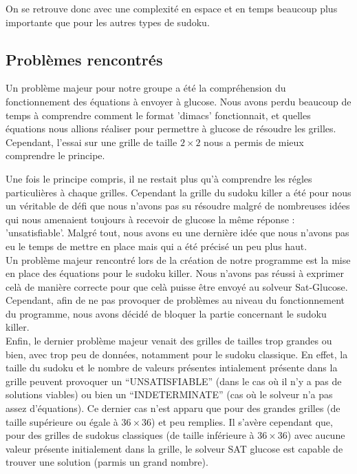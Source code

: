 \documentclass[a4paper,8pt,french,fleqn]{article}
\begin{document}
On se retrouve donc avec une complexité en espace et en temps beaucoup plus importante que pour les autres types de sudoku.

\subsection{Problèmes rencontrés}

Un problème majeur pour notre groupe a été la compréhension du fonctionnement des équations à envoyer à glucose. Nous avons perdu beaucoup de temps à comprendre comment le format 'dimacs' fonctionnait, et quelles équations nous allions réaliser pour permettre à glucose de résoudre les grilles. Cependant, l'essai sur une grille de taille $2 \times 2$ nous a permis de mieux comprendre le principe.

Une fois le principe compris, il ne restait plus qu'à comprendre les régles particulières à chaque grilles. Cependant la grille du sudoku killer a été pour nous un véritable de défi que nous n'avons pas su résoudre malgré de nombreuses idées qui nous amenaient toujours à recevoir de glucose la même réponse : 'unsatisfiable'. Malgré tout, nous avons eu une dernière idée que nous n'avons pas eu le temps de mettre en place mais qui a été précisé un peu plus haut. \\

Un problème majeur rencontré lors de la création de notre programme est la mise en place des équations pour le sudoku killer. Nous n'avons pas réussi à exprimer celà de manière correcte pour que celà puisse être envoyé au solveur Sat-Glucose. Cependant, afin de ne pas provoquer de problèmes au niveau du fonctionnement du programme, nous avons décidé de bloquer la partie concernant le sudoku killer.\\ 

Enfin, le dernier problème majeur venait des grilles de tailles trop grandes ou bien, avec trop peu de données, notamment pour le sudoku classique. En effet, la taille du sudoku et le nombre de valeurs présentes intialement présente dans la grille peuvent provoquer un ``UNSATISFIABLE'' (dans le cas où il n'y a pas de solutions viables) ou bien un ``INDETERMINATE'' (cas où le solveur n'a pas assez d'équations). Ce dernier cas n'est apparu que pour des grandes grilles (de taille supérieure ou égale à $36 \times 36$) et peu remplies. Il s'avère cependant que, pour des grilles de sudokus classiques (de taille inférieure à $36 \times 36$) avec aucune valeur présente initialement dans la grille, le solveur SAT glucose est capable de trouver une solution (parmis un grand nombre). 
\end{document}
